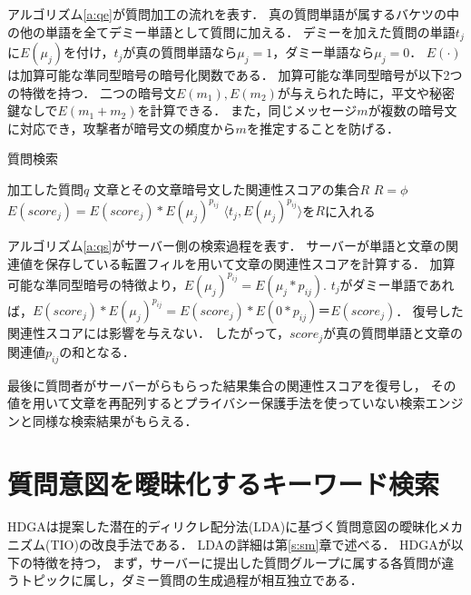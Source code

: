 \documentclass[master]{suribt}
\theoremstyle{definition}
\begin{document}
 アルゴリズム\ref{a:qe}が質問加工の流れを表す．
 真の質問単語が属するバケツの中の他の単語を全てデミー単語として質問に加える．
 デミーを加えた質問の単語$t_j$に$E(\mu_j)$を付け，$t_j$が真の質問単語なら$\mu_j=1$，ダミー単語なら$\mu_j=0$．
 $E(\cdot)$は加算可能な準同型暗号\cite{benaloh_dense_1994}の暗号化関数である．
 加算可能な準同型暗号が以下2つの特徴を持つ．
 二つの暗号文$E(m_1), E(m_2)$が与えられた時に，平文や秘密鍵なしで$E( m_1 + m_2 )$を計算できる．
 また，同じメッセージ$m$が複数の暗号文に対応でき，攻撃者が暗号文の頻度から$m$を推定することを防げる．

 \begin{algorithm}
 \caption{質問検索}
 \begin{algorithmic}[1]
  \Require 加工した質問$q$
  \Ensure 文章とその文章暗号文した関連性スコアの集合$R$
  \State $R=\phi$
     \State $E(score_j)=E(score_j)*E(\mu_j)^{p_{ij}}$
    \Else
     \State $\langle t_j,E(\mu_j)^{p_{ij}}\rangle$を$R$に入れる
    \EndIf
   \EndFor
  \EndFor
 \EndFunction
 \end{algorithmic}
 \label{a:qs}
 \end{algorithm}

 アルゴリズム\ref{a:qs}がサーバー側の検索過程を表す．
 サーバーが単語と文章の関連値を保存している転置フィルを用いて文章の関連性スコアを計算する．
 加算可能な準同型暗号の特徴より，$E(\mu_j)^{p_{ij}}=E(\mu_j*p_{ij})$.
 $t_j$がダミー単語であれば，$E(score_j)*E(\mu_j)^{p_{ij}}=E(score_j)*E(0*p_{ij})＝E(score_j)$．
 復号した関連性スコアには影響を与えない．
 したがって，$score_j$が真の質問単語と文章の関連値$p_{ij}$の和となる．

 最後に質問者がサーバーがらもらった結果集合の関連性スコアを復号し，
 その値を用いて文章を再配列するとプライバシー保護手法を使っていない検索エンジンと同様な検索結果がもらえる．

 \section{質問意図を曖昧化するキーワード検索}

 HDGAは\cite{toi2012}提案した潜在的ディリクレ配分法(LDA)\cite{lda2003}に基づく質問意図の曖昧化メカニズム(TIO)の改良手法である．
 LDAの詳細は第\ref{s:sm}章で述べる．
 HDGAが以下の特徴を持つ，
 まず，サーバーに提出した質問グループに属する各質問が違うトピックに属し，ダミー質問の生成過程が相互独立である．
\end{document}
